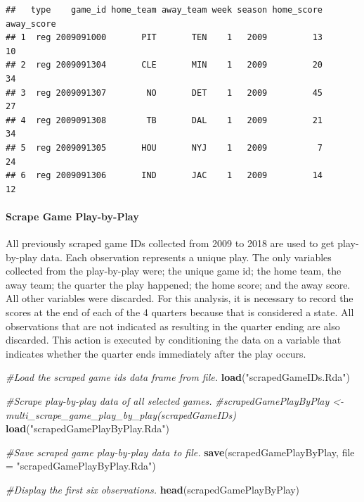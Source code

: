 \documentclass[
]{article}
\newenvironment{Shaded}{\begin{snugshade}}{\end{snugshade}}
\newcommand{\CommentTok}[1]{\textcolor[rgb]{0.56,0.35,0.01}{\textit{#1}}}
\newcommand{\DataTypeTok}[1]{\textcolor[rgb]{0.13,0.29,0.53}{#1}}
\newcommand{\KeywordTok}[1]{\textcolor[rgb]{0.13,0.29,0.53}{\textbf{#1}}}
\newcommand{\NormalTok}[1]{#1}
\newcommand{\StringTok}[1]{\textcolor[rgb]{0.31,0.60,0.02}{#1}}
\let\oldparagraph\paragraph
\renewcommand{\paragraph}[1]{\oldparagraph{#1}\mbox{}}
\begin{document}
\begin{verbatim}
##   type    game_id home_team away_team week season home_score away_score
## 1  reg 2009091000       PIT       TEN    1   2009         13         10
## 2  reg 2009091304       CLE       MIN    1   2009         20         34
## 3  reg 2009091307        NO       DET    1   2009         45         27
## 4  reg 2009091308        TB       DAL    1   2009         21         34
## 5  reg 2009091305       HOU       NYJ    1   2009          7         24
## 6  reg 2009091306       IND       JAC    1   2009         14         12
\end{verbatim}

\hypertarget{scrape-game-play-by-play}{%
\paragraph{Scrape Game Play-by-Play}\label{scrape-game-play-by-play}}

All previously scraped game IDs collected from 2009 to 2018 are used to
get play-by-play data. Each observation represents a unique play. The
only variables collected from the play-by-play were; the unique game id;
the home team, the away team; the quarter the play happened; the home
score; and the away score. All other variables were discarded. For this
analysis, it is necessary to record the scores at the end of each of the
4 quarters because that is considered a state. All observations that are
not indicated as resulting in the quarter ending are also discarded.
This action is executed by conditioning the data on a variable that
indicates whether the quarter ends immediately after the play occurs.

\begin{Shaded}
\begin{Highlighting}[]
\CommentTok{#Load the scraped game ids data frame from file.}
\KeywordTok{load}\NormalTok{(}\StringTok{"scrapedGameIDs.Rda"}\NormalTok{)}

\CommentTok{#Scrape play-by-play data of all selected games.}
\CommentTok{#scrapedGamePlayByPlay <- multi_scrape_game_play_by_play(scrapedGameIDs)}
\KeywordTok{load}\NormalTok{(}\StringTok{"scrapedGamePlayByPlay.Rda"}\NormalTok{)}

\CommentTok{#Save scraped game play-by-play data to file.}
\KeywordTok{save}\NormalTok{(scrapedGamePlayByPlay, }\DataTypeTok{file =} \StringTok{"scrapedGamePlayByPlay.Rda"}\NormalTok{)}

\CommentTok{#Display the first six observations.}
\KeywordTok{head}\NormalTok{(scrapedGamePlayByPlay)}
\end{Highlighting}
\end{Shaded}
\end{document}
